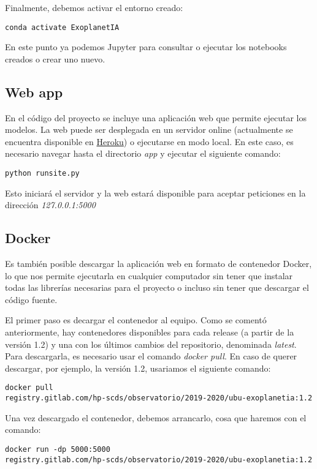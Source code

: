 Finalmente, debemos activar el entorno creado:

\texttt{conda activate ExoplanetIA}

En este punto ya podemos Jupyter para consultar o ejecutar los notebooks creados o crear uno nuevo.

\subsection{Web app}

En el código del proyecto se incluye una aplicación web que permite ejecutar los modelos. La web puede ser desplegada en un servidor online (actualmente se encuentra disponible en \href{https://exoplanetia.herokuapp.com/}{Heroku}) o ejecutarse en modo local. En este caso, es necesario navegar hasta el directorio \textit{app} y ejecutar el siguiente comando:

\texttt{python runsite.py}

Esto iniciará el servidor y la web estará disponible para aceptar peticiones en la dirección \textit{127.0.0.1:5000} 

\subsection{Docker}

Es también posible descargar la aplicación web en formato de contenedor Docker, lo que nos permite ejecutarla en cualquier computador sin tener que instalar todas las librerías necesarias para el proyecto o incluso sin tener que descargar el código fuente.

El primer paso es decargar el contenedor al equipo. Como se comentó anteriormente, hay contenedores disponibles para cada release (a partir de la versión 1.2) y una con los últimos cambios del repositorio, denominada \textit{latest}. Para descargarla, es necesario usar el comando \textit{docker pull}. En caso de querer descargar, por ejemplo, la versión 1.2, usariamos el siguiente comando:

\texttt{docker pull \\ registry.gitlab.com/hp-scds/observatorio/2019-2020/ubu-exoplanetia:1.2}

Una vez descargado el contenedor, debemos arrancarlo, cosa que haremos con el comando:

\texttt{docker run -dp 5000:5000 \\ registry.gitlab.com/hp-scds/observatorio/2019-2020/ubu-exoplanetia:1.2}

